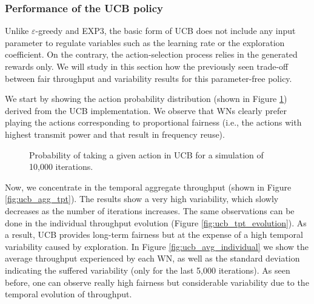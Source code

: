 \documentclass[preprint,12pt]{elsarticle}
\begin{document}
\subsubsection{Performance of the UCB policy}
\label{section:ucb_study}		
Unlike $\varepsilon$-greedy and EXP3, the basic form of UCB does not include any input parameter to regulate variables such as the learning rate or the exploration coefficient. On the contrary, the action-selection process relies in the generated rewards only. We will study in this section how the previously seen trade-off between fair throughput and variability results for this parameter-free policy.

We start by showing the action probability distribution (shown in Figure \ref{fig:actions_probability_ucb}) derived from the UCB implementation. We observe that WNs clearly prefer playing the actions corresponding to proportional fairness (i.e., the actions with highest transmit power and that result in frequency reuse). 

\begin{figure}[h!]
	\centering							
	\caption{Probability of taking a given action in UCB for a simulation of 10,000 iterations.}
	\label{fig:actions_probability_ucb}
\end{figure}	

Now, we concentrate in the temporal aggregate throughput (shown in Figure \ref{fig:ucb_agg_tpt}). The results show a very high variability, which slowly decreases as the number of iterations increases. 
The same observations can be done in the individual throughput evolution (Figure \ref{fig:ucb_tpt_evolution}). As a result, UCB provides long-term fairness but at the expense of a high temporal variability caused by exploration. In Figure \ref{fig:ucb_avg_individual} we show the average throughput experienced by each WN, as well as the standard deviation indicating the suffered variability (only for the last 5,000 iterations). As seen before, one can observe really high fairness but considerable variability due to the temporal evolution of throughput.	
\end{document}
